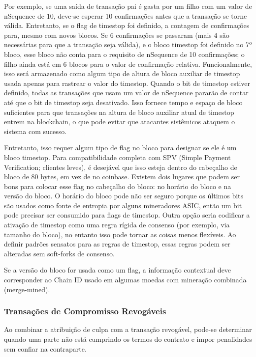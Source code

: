 \documentclass[letterpaper,11pt]{article}
\begin{document}
Por exemplo, se uma saída de transação pai é gasta por um filho com um valor
de nSequence de 10, deve-se esperar 10 confirmações antes que a transação
se torne válida. Entretanto, se o flag de timestop foi definido, a contagem
de confirmações para, mesmo com novos blocos. Se 6 confirmações se
passaram (mais 4 são necessárias para que a transação seja válida), e o
bloco timestop foi definido no 7º bloco, esse bloco não conta para o
requisito de nSequence de 10 confirmações; o filho ainda está em 6 blocos
para o valor de confirmação relativa. Funcionalmente, isso será armazenado
como algum tipo de altura de bloco auxiliar de timestop usada apenas para
rastrear o valor do timestop. Quando o bit de timestop estiver definido,
todas as transações que usam um valor de nSequence pararão de contar até que
o bit de timestop seja desativado. Isso fornece tempo e espaço de bloco
suficientes para que transações na altura de bloco auxiliar atual de
timestop entrem na blockchain, o que pode evitar que atacantes sistêmicos
ataquem o sistema com sucesso.

Entretanto, isso requer algum tipo de flag no bloco para designar se ele é
um bloco timestop. Para compatibilidade completa com SPV (Simple Payment
Verification; clientes leves), é desejável que isso esteja dentro do
cabeçalho de bloco de 80 bytes, em vez de no coinbase. Existem dois lugares
que podem ser bons para colocar esse flag no cabeçalho do bloco: no horário
do bloco e na versão do bloco. O horário do bloco pode não ser seguro porque
os últimos bits são usados como fonte de entropia por alguns mineradores
ASIC, então um bit pode precisar ser consumido para flags de timestop. Outra
opção seria codificar a ativação de timestop como uma regra rígida de
consenso (por exemplo, via tamanho do bloco), no entanto isso pode tornar
as coisas menos flexíveis. Ao definir padrões sensatos para as regras de
timestop, essas regras podem ser alteradas sem soft-forks de consenso.

Se a versão do bloco for usada como um flag, a informação contextual deve
corresponder ao Chain ID usado em algumas moedas com mineração combinada
(merge-mined).

\subsubsection{Transações de Compromisso Revogáveis}

Ao combinar a atribuição de culpa com a transação revogável, pode-se
determinar quando uma parte não está cumprindo os termos do contrato e
impor penalidades sem confiar na contraparte.
\end{document}
